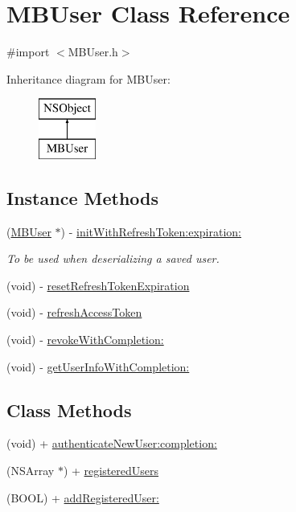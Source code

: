 \hypertarget{interface_m_b_user}{\section{M\-B\-User Class Reference}
\label{interface_m_b_user}
}


{\ttfamily \#import $<$M\-B\-User.\-h$>$}

Inheritance diagram for M\-B\-User\-:\begin{figure}[H]
\begin{center}
\leavevmode
\includegraphics[height=2.000000cm]{interface_m_b_user}
\end{center}
\end{figure}
\subsection*{Instance Methods}
\begin{DoxyCompactItemize}
\item 
(\hyperlink{interface_m_b_user}{M\-B\-User} $\ast$) -\/ \hyperlink{interface_m_b_user_afa309643318bee0ce22a0d6dd1788726}{init\-With\-Refresh\-Token\-:expiration\-:}
\begin{DoxyCompactList}\small\item\em To be used when deserializing a saved user. \end{DoxyCompactList}\item 
(void) -\/ \hyperlink{interface_m_b_user_ab61dd468c5d14a9aafc488b8b2c37f40}{reset\-Refresh\-Token\-Expiration}
\item 
(void) -\/ \hyperlink{interface_m_b_user_a988475a0321b26e1146e538bfee65ef6}{refresh\-Access\-Token}
\item 
(void) -\/ \hyperlink{interface_m_b_user_a1e56d1480e455bac35e1a57a2db7fb47}{revoke\-With\-Completion\-:}
\item 
(void) -\/ \hyperlink{interface_m_b_user_abcc7b52369b86b5d370384bb4c797ce8}{get\-User\-Info\-With\-Completion\-:}
\end{DoxyCompactItemize}
\subsection*{Class Methods}
\begin{DoxyCompactItemize}
\item 
(void) + \hyperlink{interface_m_b_user_a2cfdd3551de108fd02e909f267379947}{authenticate\-New\-User\-:completion\-:}
\item 
(N\-S\-Array $\ast$) + \hyperlink{interface_m_b_user_ad0d4a054b9aaf94b637b09d0e4ed74e8}{registered\-Users}
\item 
(B\-O\-O\-L) + \hyperlink{interface_m_b_user_a9dd337b188782e945b16c6d55075bfc2}{add\-Registered\-User\-:}
\end{DoxyCompactItemize}

